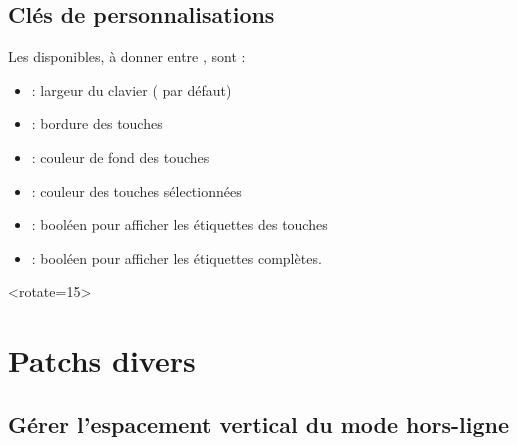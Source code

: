 \documentclass[french,11pt,a4paper]{article}
\begin{document}
\subsection{Clés de personnalisations}

Les  disponibles, à donner entre \MontreCode{[...]}, sont :

\begin{itemize}
	\item {} : largeur du clavier (\MontreCode{16cm} par défaut)
	\item {} : bordure des touches
	\item {} : couleur de fond des touches
	\item {} : couleur des touches sélectionnées
	\item {} : booléen pour afficher les étiquettes des touches
	\item {} : booléen pour afficher les étiquettes complètes.
\end{itemize}

\begin{DemoCode}{}
\ClavierFrancais[Complet]{}
\end{DemoCode}

\begin{DemoCode}{}
\end{DemoCode}

\begin{DemoCode}{}
\end{DemoCode}

\begin{DemoCode}{}
\ClavierFrancais[Largeur=6cm]{}
\end{DemoCode}

\begin{DemoCode}{}
\ClavierFrancais[Largeur=4cm]<rotate=15>{}
\end{DemoCode}

\pagebreak

\section{Patchs divers}

\subsection{Gérer l'espacement vertical du mode hors-ligne}
\end{document}
